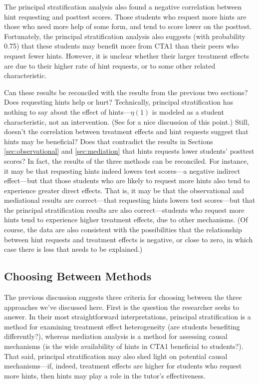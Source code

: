\documentclass{article}\usepackage[]{graphicx}\usepackage[]{color}
\begin{document}
The
principal stratification analysis also found a negative correlation
between hint requesting and posttest scores.
Those students who request more hints are those who need more help of
some form, and tend to score lower on the posttest.
Fortunately, the principal stratification analysis also suggests (with
probability 0.75) that these students
may benefit more from CTA1 than their peers who request fewer hints.
However, it is unclear whether their larger treatment effects are due
to their higher rate of hint requests, or to some other related characteristic.

Can these results be reconciled with the results from the previous two
sections?
Does requesting hints help or hurt?
Technically, principal stratification has nothing to say about the effect of hints---$\eta(1)$
is modeled as a student characteristic, not an intervention.
(See \citealt{jin2008principal} for a nice discussion of this point.)
Still, doesn't the correlation between treatment effects and hint
requests suggest that hints may be beneficial?
Does that contradict the results in Sections \ref{sec:observational}
and \ref{sec:mediation} that hints requests lower students' posttest
scores?
In fact, the results of the three methods can be reconciled.
For instance, it may be that requesting hints indeed lowers test
scores---a negative indirect effect---but that those students who are
likely to request more hints also tend to experience greater direct
effects.
That is, it may be that the observational and mediational results are
correct---that requesting hints lowers test scores---but that the principal stratification
results are also correct---students who request more hints tend to
experience higher treatment effects, due to other mechanisms.
(Of course, the data are also consistent with the possibilities that
the relationship between hint requests and treatment effects is
negative, or close to zero, in which case there is less that needs to
be explained.)

\subsection{Choosing Between Methods}

The previous discussion suggests three criteria for choosing between
the three approaches we've discussed here.
First is the question the researcher seeks to answer.
In their most straightforward interpretations, principal stratification
is a method for examining treatment effect heterogeneity (are students
benefiting differently?), whereas
mediation analysis is a method for assessing causal mechanisms (is the
wide availability of hints in CTA1 beneficial to students?).
That said, principal stratification may also shed light on potential causal mechanisms---if,
indeed, treatment effects are higher for students who request more
hints, then hints may play a role in the tutor's effectiveness.
\end{document}
